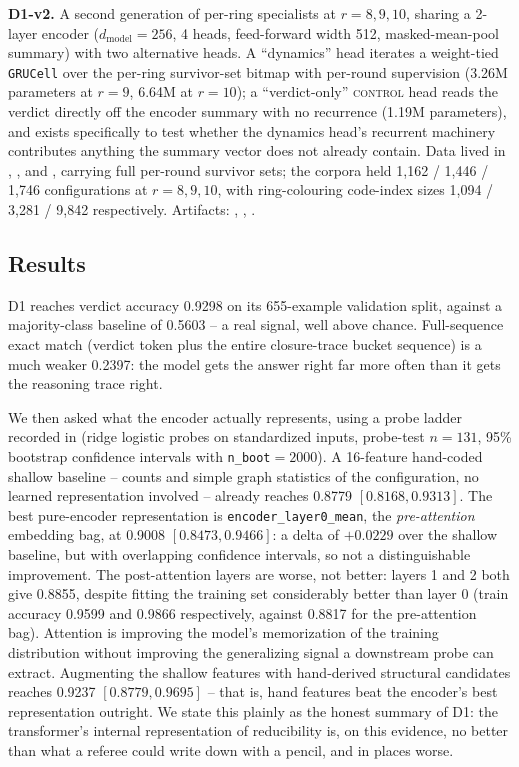 \textbf{D1-v2.} A second generation of per-ring specialists at
$r = 8, 9, 10$, sharing a 2-layer encoder ($d_{\mathrm{model}}=256$, 4
heads, feed-forward width 512, masked-mean-pool summary) with two
alternative heads. A ``dynamics'' head iterates a weight-tied
\texttt{GRUCell} over the per-ring survivor-set bitmap with per-round
supervision (3.26M parameters at $r=9$, 6.64M at $r=10$); a
``verdict-only'' \textsc{control} head reads the verdict directly off the
encoder summary with no recurrence (1.19M parameters), and exists
specifically to test whether the dynamics head's recurrent machinery
contributes anything the summary vector does not already contain. Data
lived in , ,
and , carrying full per-round survivor sets;
the corpora held 1{,}162 / 1{,}446 / 1{,}746 configurations at $r=8,9,10$, with
ring-colouring code-index sizes 1{,}094 / 3{,}281 / 9{,}842 respectively. Artifacts: ,
, .

\subsection{Results}

D1 reaches verdict accuracy 0.9298 on its 655-example validation split,
against a majority-class baseline of 0.5603 -- a real signal, well above
chance. Full-sequence exact match (verdict token plus the entire
closure-trace bucket sequence) is a much weaker 0.2397: the model gets the
answer right far more often than it gets the reasoning trace right.

We then asked what the encoder actually represents, using a probe ladder
recorded in  (ridge logistic probes on
standardized inputs, probe-test $n=131$, 95\% bootstrap confidence
intervals with \texttt{n\_boot}$=2000$). A 16-feature hand-coded shallow
baseline -- counts and simple graph statistics of the configuration, no
learned representation involved -- already reaches 0.8779
$[0.8168, 0.9313]$. The best pure-encoder representation is
\texttt{encoder\_layer0\_mean}, the \emph{pre-attention} embedding bag, at
0.9008 $[0.8473, 0.9466]$: a delta of $+0.0229$ over the shallow baseline,
but with overlapping confidence intervals, so not a distinguishable
improvement. The post-attention layers are worse, not better: layers 1 and
2 both give 0.8855, despite fitting the training set considerably better
than layer 0 (train accuracy 0.9599 and 0.9866 respectively, against 0.8817
for the pre-attention bag). Attention is improving the model's memorization
of the training distribution without improving the generalizing signal a
downstream probe can extract. Augmenting the shallow features with
hand-derived structural candidates reaches 0.9237
$[0.8779, 0.9695]$ -- that is, hand features beat the encoder's best
representation outright. We state this plainly as the honest summary of
D1: the transformer's internal representation of reducibility is, on this
evidence, no better than what a referee could write down with a pencil,
and in places worse.

